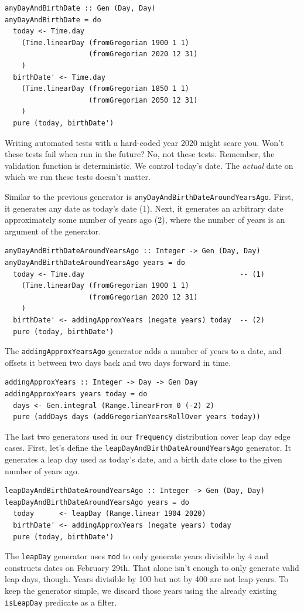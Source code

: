 \begin{verbatim}
anyDayAndBirthDate :: Gen (Day, Day)
anyDayAndBirthDate = do
  today <- Time.day
    (Time.linearDay (fromGregorian 1900 1 1)
                    (fromGregorian 2020 12 31)
    )
  birthDate' <- Time.day
    (Time.linearDay (fromGregorian 1850 1 1)
                    (fromGregorian 2050 12 31)
    )
  pure (today, birthDate')
\end{verbatim}
Writing automated tests with a hard-coded year 2020 might scare you.
Won't these tests fail when run in the future? No, not these tests.
Remember, the validation function is deterministic. We control today's
date. The \emph{actual} date on which we run these tests doesn't matter.

Similar to the previous generator is
\texttt{anyDayAndBirthDateAroundYearsAgo}. First, it generates any date
as today's date (1). Next, it generates an arbitrary date approximately
some number of years ago (2), where the number of years is an argument
of the generator.

\begin{verbatim}
anyDayAndBirthDateAroundYearsAgo :: Integer -> Gen (Day, Day)
anyDayAndBirthDateAroundYearsAgo years = do
  today <- Time.day                                     -- (1)
    (Time.linearDay (fromGregorian 1900 1 1)
                    (fromGregorian 2020 12 31)
    )
  birthDate' <- addingApproxYears (negate years) today  -- (2)
  pure (today, birthDate')
\end{verbatim}
The \texttt{addingApproxYearsAgo} generator adds a number of years to a
date, and offsets it between two days back and two days forward in time.

\begin{verbatim}
addingApproxYears :: Integer -> Day -> Gen Day
addingApproxYears years today = do
  days <- Gen.integral (Range.linearFrom 0 (-2) 2)
  pure (addDays days (addGregorianYearsRollOver years today))
\end{verbatim}
The last two generators used in our \texttt{frequency} distribution
cover leap day edge cases. First, let's define the
\texttt{leapDayAndBirthDateAroundYearsAgo} generator. It generates a
leap day used as today's date, and a birth date close to the given
number of years ago.

\begin{verbatim}
leapDayAndBirthDateAroundYearsAgo :: Integer -> Gen (Day, Day)
leapDayAndBirthDateAroundYearsAgo years = do
  today      <- leapDay (Range.linear 1904 2020)
  birthDate' <- addingApproxYears (negate years) today
  pure (today, birthDate')
\end{verbatim}
The \texttt{leapDay} generator uses \texttt{mod} to only generate years
divisible by 4 and constructs dates on February 29th. That alone isn't
enough to only generate valid leap days, though. Years divisible by 100
but not by 400 are not leap years. To keep the generator simple, we
discard those years using the already existing \texttt{isLeapDay}
predicate as a filter.

